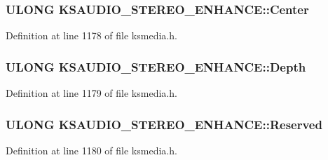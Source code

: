 \subsubsection[{\texorpdfstring{Center}{Center}}]{\setlength{\rightskip}{0pt plus 5cm}U\+L\+O\+NG K\+S\+A\+U\+D\+I\+O\+\_\+\+S\+T\+E\+R\+E\+O\+\_\+\+E\+N\+H\+A\+N\+C\+E\+::\+Center}\hypertarget{struct_k_s_a_u_d_i_o___s_t_e_r_e_o___e_n_h_a_n_c_e_af14ee918ba1c68eb85f09bc6a442194f}{}\label{struct_k_s_a_u_d_i_o___s_t_e_r_e_o___e_n_h_a_n_c_e_af14ee918ba1c68eb85f09bc6a442194f}


Definition at line 1178 of file ksmedia.\+h.

\subsubsection[{\texorpdfstring{Depth}{Depth}}]{\setlength{\rightskip}{0pt plus 5cm}U\+L\+O\+NG K\+S\+A\+U\+D\+I\+O\+\_\+\+S\+T\+E\+R\+E\+O\+\_\+\+E\+N\+H\+A\+N\+C\+E\+::\+Depth}\hypertarget{struct_k_s_a_u_d_i_o___s_t_e_r_e_o___e_n_h_a_n_c_e_a6acafd78212c2965d13ae784787c769f}{}\label{struct_k_s_a_u_d_i_o___s_t_e_r_e_o___e_n_h_a_n_c_e_a6acafd78212c2965d13ae784787c769f}


Definition at line 1179 of file ksmedia.\+h.

\subsubsection[{\texorpdfstring{Reserved}{Reserved}}]{\setlength{\rightskip}{0pt plus 5cm}U\+L\+O\+NG K\+S\+A\+U\+D\+I\+O\+\_\+\+S\+T\+E\+R\+E\+O\+\_\+\+E\+N\+H\+A\+N\+C\+E\+::\+Reserved}\hypertarget{struct_k_s_a_u_d_i_o___s_t_e_r_e_o___e_n_h_a_n_c_e_a33d9fc3027b6ce82b729168e189d12f8}{}\label{struct_k_s_a_u_d_i_o___s_t_e_r_e_o___e_n_h_a_n_c_e_a33d9fc3027b6ce82b729168e189d12f8}


Definition at line 1180 of file ksmedia.\+h.

